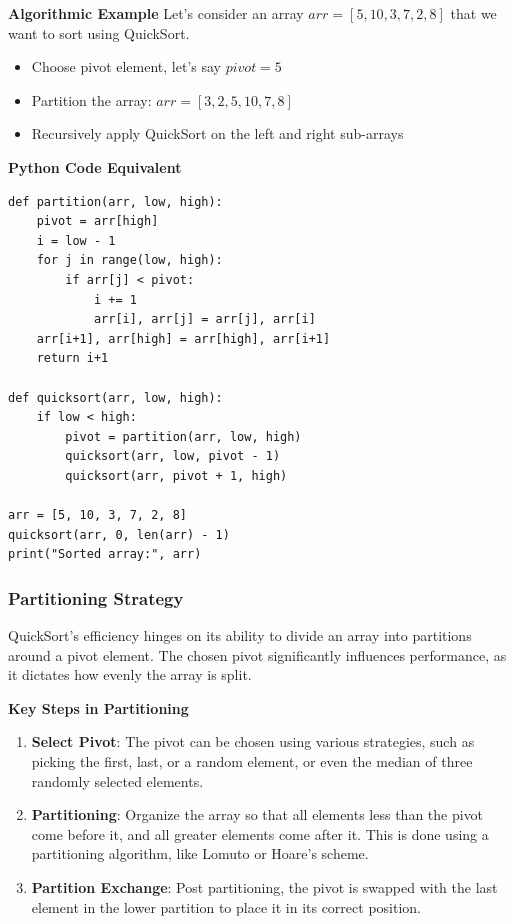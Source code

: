 \documentclass[12pt]{book} %
\begin{document}
\textbf{Algorithmic Example}
Let's consider an array $arr = [5, 10, 3, 7, 2, 8]$ that we want to sort using QuickSort.
\FloatBarrier
\begin{itemize}
\item Choose pivot element, let's say $pivot = 5$
\item Partition the array: $arr = [3, 2, 5, 10, 7, 8]$
\item Recursively apply QuickSort on the left and right sub-arrays
\end{itemize}
\FloatBarrier
\textbf{Python Code Equivalent}
\FloatBarrier
\begin{lstlisting}
def partition(arr, low, high):
    pivot = arr[high]
    i = low - 1
    for j in range(low, high):
        if arr[j] < pivot:
            i += 1
            arr[i], arr[j] = arr[j], arr[i]
    arr[i+1], arr[high] = arr[high], arr[i+1]
    return i+1

def quicksort(arr, low, high):
    if low < high:
        pivot = partition(arr, low, high)
        quicksort(arr, low, pivot - 1)
        quicksort(arr, pivot + 1, high)

arr = [5, 10, 3, 7, 2, 8]
quicksort(arr, 0, len(arr) - 1)
print("Sorted array:", arr)
\end{lstlisting}
\FloatBarrier

\subsubsection{Partitioning Strategy}
QuickSort's efficiency hinges on its ability to divide an array into partitions around a pivot element. The chosen pivot significantly influences performance, as it dictates how evenly the array is split.

\textbf{Key Steps in Partitioning}
\begin{enumerate}
    \item \textbf{Select Pivot}: The pivot can be chosen using various strategies, such as picking the first, last, or a random element, or even the median of three randomly selected elements.
    \item \textbf{Partitioning}: Organize the array so that all elements less than the pivot come before it, and all greater elements come after it. This is done using a partitioning algorithm, like Lomuto or Hoare's scheme.
    \item \textbf{Partition Exchange}: Post partitioning, the pivot is swapped with the last element in the lower partition to place it in its correct position.
\end{enumerate}
\end{document}
